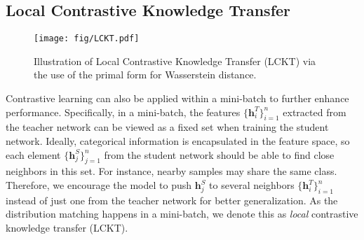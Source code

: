 \documentclass[final]{cvpr}
\newcommand{\hv}{{\boldsymbol h}}
\theoremstyle{definition}
\begin{document}
\subsection{Local Contrastive Knowledge Transfer}\label{subsec:wasserstein_primal_form}
\begin{figure}[!t]
    \centering
    \texttt{[image: fig/LCKT.pdf]}
\vspace{-2mm}
    \caption{\small\label{fig:pwd_framework} Illustration of Local Contrastive Knowledge Transfer (LCKT) via the use of the primal form for Wasserstein distance.}
    \vspace{-4mm}
\end{figure}
Contrastive learning can also be applied within a mini-batch to further enhance performance. Specifically, in a mini-batch, the features $\{\hv^T_i\}_{i=1}^n$ extracted from the teacher network can be viewed as a fixed set when training the student network. Ideally, categorical information is encapsulated in the feature space, so each element $\{\hv^S_j\}_{j=1}^n$ from the student network should be able to find close neighbors in this set. For instance, nearby samples may share the same class. Therefore, we encourage the model to push $\hv^S_j$ to several neighbors $\{\hv^T_i\}_{i=1}^n$  instead of just one from the teacher network for better generalization. As the distribution matching happens in a mini-batch, we denote this as \emph{local} contrastive knowledge transfer (LCKT).
\end{document}
